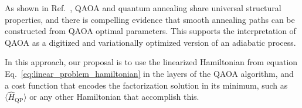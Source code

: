 As shown in Ref.~\cite{diez-valle_universal_2025}, QAOA and quantum annealing share universal
structural properties, and there is compelling evidence that smooth annealing paths can be constructed
from QAOA optimal parameters. This supports the interpretation of QAOA as a digitized
and variationally optimized version of an adiabatic process.

In this approach, our proposal is to use the linearized Hamiltonian from equation
Eq.~\ref{eq:linear_problem_hamiltonian} in the layers of the QAOA algorithm, and a cost
function that encodes the factorization solution in its minimum, such as
$\langle \hat{H}_\mathrm{QP} \rangle$ or any other Hamiltonian that accomplish this.

